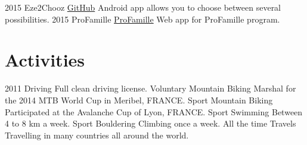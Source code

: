 \documentclass[]{Elie-cv}
\begin{document}
\begin{entrylist}
  \entry
    {2015}
    {Eze2Chooz}
    {\href{https://github.com/Hopetech/eze2chooz}{GitHub}}
    {Android app allows you to choose between several possibilities.}
   \entry
    {2015}
    {ProFamille}
    {\href{http://profamille.fr/}{ProFamille}}
    {Web app for ProFamille program.}
\end{entrylist}

\newpage

\section{Activities}

\begin{entrylist}
  \entry
    {2011}
    {Driving}
    {}
    {Full clean driving license.}
   \entry
    {Voluntary}
    {Mountain Biking}
    {}
    {Marshal for the 2014 MTB World Cup in Meribel, FRANCE.}
   \entry
    {Sport}
    {Mountain Biking}
    {}
    {Participated at the Avalanche Cup of Lyon, FRANCE.}
   \entry
    {Sport}
    {Swimming}
    {}
    {Between 4 to 8 km a week.}
   \entry
    {Sport}
    {Bouldering}
    {}
    {Climbing once a week.}
   \entry
    {All the time}
    {Travels}
    {}
    {Travelling in many countries all around the world.}
\end{entrylist}
\end{document}
